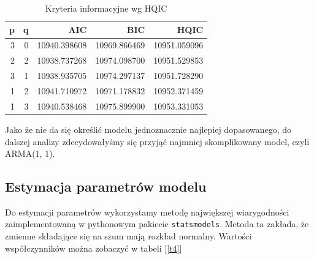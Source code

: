 \documentclass{article}
\theoremstyle{break}
\newcommand{\code}[1]{\colorbox{light-gray}{\texttt{#1}}}
\begin{document}
	\begin{table}[H]
		\centering
		\begin{tabular}{|r|r|r|r|r|}
			\hline
			\rowcolor[HTML]{C0C0C0} 
			{\color[HTML]{111111} \textbf{p}} & {\color[HTML]{111111} \textbf{q}} & {\color[HTML]{111111} \textbf{AIC}} & {\color[HTML]{111111} \textbf{BIC}} & {\color[HTML]{111111} \textbf{HQIC}} \\ \hline
			{\color[HTML]{111111} 3}          & {\color[HTML]{111111} 0}          & {\color[HTML]{111111} 10940.398608} & {\color[HTML]{111111} 10969.866469} & {\color[HTML]{111111} 10951.059096}  \\ \hline
			{\color[HTML]{111111} 2}          & {\color[HTML]{111111} 2}          & {\color[HTML]{111111} 10938.737268} & {\color[HTML]{111111} 10974.098700} & {\color[HTML]{111111} 10951.529853}  \\ \hline
			{\color[HTML]{111111} 3}          & {\color[HTML]{111111} 1}          & {\color[HTML]{111111} 10938.935705} & {\color[HTML]{111111} 10974.297137} & {\color[HTML]{111111} 10951.728290}  \\ \hline
			{\color[HTML]{111111} 1}          & {\color[HTML]{111111} 2}          & {\color[HTML]{111111} 10941.710972} & {\color[HTML]{111111} 10971.178832} & {\color[HTML]{111111} 10952.371459}  \\ \hline
			{\color[HTML]{111111} 1}          & {\color[HTML]{111111} 3}          & {\color[HTML]{111111} 10940.538468} & {\color[HTML]{111111} 10975.899900} & {\color[HTML]{111111} 10953.331053}  \\ \hline
		\end{tabular}
		\caption{Kryteria informacyjne wg HQIC}
		\label{t3}
	\end{table}
	
	Jako że nie da się określić modelu jednoznacznie najlepiej dopasowanego, do dalszej analizy zdecydowałyśmy się przyjąć najmniej skomplikowany model, czyli ARMA(1, 1).
	
	\subsection{Estymacja parametrów modelu}
	Do estymacji parametrów wykorzystamy metodę największej wiarygodności zaimplementowaną w pythonowym pakiecie \code{statsmodels}. Metoda ta zakłada, że zmienne składające się na szum mają rozkład normalny. Wartości współczynników można zobaczyć w tabeli [\ref{t4}]
	
\end{document}

